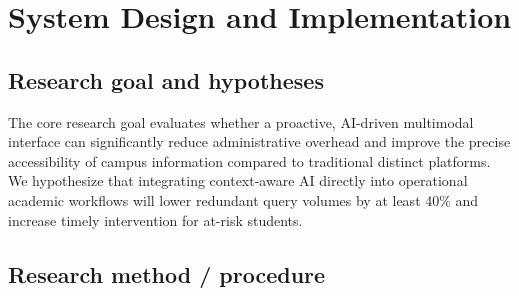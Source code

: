 \documentclass[]{einformatica}
\begin{document}
\begin{table}[htbp]
\centering
\caption{Comparison of the Proposed System versus Existing Educational Platforms}
\label{tab:platform_comparison}
\end{table}

\section{System Design and Implementation}\label{sec:Method}

\subsection*{Research goal and hypotheses}

The core research goal evaluates whether a proactive, AI-driven multimodal interface can significantly reduce administrative overhead and improve the precise accessibility of campus information compared to traditional distinct platforms. We hypothesize that integrating context-aware AI directly into operational academic workflows will lower redundant query volumes by at least 40\% and increase timely intervention for at-risk students.

\subsection*{Research method / procedure}
\end{document}
